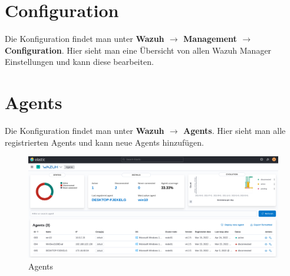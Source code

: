 \section{Configuration}
Die Konfiguration findet man unter \textbf{Wazuh $\rightarrow$ Management $\rightarrow$ Configuration}.
Hier sieht man eine Übersicht von allen Wazuh Manager Einstellungen und kann diese bearbeiten.

\section{Agents}
Die Konfiguration findet man unter \textbf{Wazuh $\rightarrow$ Agents}.
Hier sieht man alle registrierten Agents und kann neue Agents hinzufügen.

\begin{figure}[H]
    \centering
    \includegraphics[width=\linewidth]{../img/wazuh-agents.png}
    \caption{Agents}
\end{figure}

